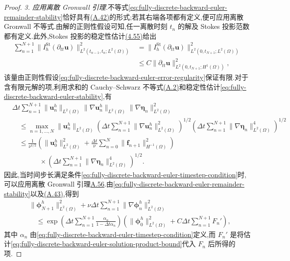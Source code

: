 \begin{proof}
\textit{3. 应用离散 Gronwall 引理.}不等式\cref{eq:fully-discrete-backward-euler-remainder-stability}恰好具有\hyperref[eq:appendix-a-42]{(A.42)}的形式;若其右端各项都有定义,便可应用离散 Gronwall 不等式.由解的正则性假设可知,任一离散时刻 $t_n$ 的解及 Stokes 投影范数都有定义.此外,Stokes 投影的稳定性估计\hyperref[eq:stokes-projection-stability-velocity]{(4.55)}给出
\[
\begin{aligned}
 \sum_{n=1}^{N+1}
    \|I_h^{\mathrm{St}}(\partial_{tt}\bm{u})\|_{L^2(t_{n-1},t_n;L^2(\Omega))}^2
  &=\|I_h^{\mathrm{St}}(\partial_{tt}\bm{u})\|_{L^2(0,t_{N+1};L^2(\Omega))}^2\\
  &\le C\|\partial_{tt}\bm{u}\|_{L^2(0,t_{N+1};H^1(\Omega))}^2,
\end{aligned}
\]
该量由正则性假设\cref{eq:fully-discrete-backward-euler-error-regularity}保证有限.对于含有限元解的项,利用求和的 Cauchy--Schwarz 不等式\hyperref[eq:appendix-a-2]{(A.2)}和稳定性估计\cref{eq:fully-discrete-backward-euler-stability},有
\begin{equation}\label{eq:fully-discrete-backward-euler-solution-product-bound}
\begin{aligned}
 &\Delta t\sum_{n=1}^{N+1}
     \|\bm{u}_n^h\|_{L^2(\Omega)}
     \|\nabla\bm{u}_n^h\|_{L^2(\Omega)}
     \|\nabla\symbf{\eta}_n\|_{L^2(\Omega)}^2\\
 &\quad\le\max_{n=1,\ldots,N}\|\bm{u}_n^h\|_{L^2(\Omega)}
       \left(\Delta t\sum_{n=1}^{N+1}
         \|\nabla\bm{u}_n^h\|_{L^2(\Omega)}^2\right)^{1/2}
       \left(\Delta t\sum_{n=1}^{N+1}
         \|\nabla\symbf{\eta}_n\|_{L^2(\Omega)}^4\right)^{1/2}\\
  &\quad\le\frac1{\nu^{1/2}}
        \left(\|\bm{u}_0^h\|_{L^2(\Omega)}^2
           +\frac{\Delta t}{\nu}\sum_{n=0}^{N}
              \|\bm{f}_{n+1}\|_{H^{-1}(\Omega)}^2\right)\\
  &\qquad\qquad\times\left(\Delta t\sum_{n=1}^{N+1}
          \|\nabla\symbf{\eta}_n\|_{L^2(\Omega)}^4\right)^{1/2}.
\end{aligned}
\end{equation}
因此,当时间步长满足条件\cref{eq:fully-discrete-backward-euler-timestep-condition}时,可以应用离散 Gronwall 引理\hyperref[lem:appendix-a-56]{A.56}.由\cref{eq:fully-discrete-backward-euler-remainder-stability}以及\hyperref[eq:appendix-a-43]{(A.43)},得到
\begin{equation}\label{eq:fully-discrete-backward-euler-discrete-gronwall-bound}
\begin{aligned}
 &\|\symbf{\phi}_{N+1}^h\|_{L^2(\Omega)}^2
   +\nu\Delta t\sum_{n=1}^{N+1}
       \|\nabla\symbf{\phi}_n^h\|_{L^2(\Omega)}^2\\
 &\quad\le\exp\!\left(\Delta t\sum_{n=1}^{N+1}
          \frac{\alpha_n}{1-\Delta t\alpha_n}\right)
       \left(\|\symbf{\phi}_0^h\|_{L^2(\Omega)}^2
          +C\Delta t\sum_{n=1}^{N+1}F_n'\right),
\end{aligned}
\end{equation}
其中 $\alpha_n$ 由\cref{eq:fully-discrete-backward-euler-timestep-condition}定义,而 $F_n'$ 是将估计\cref{eq:fully-discrete-backward-euler-solution-product-bound}代入 $F_n$ 后所得的项.


\end{proof}
